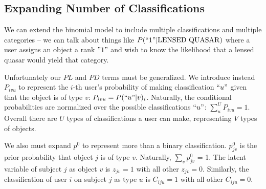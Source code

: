 \documentclass[useAMS,usenatbib,a4paper]{mn2e}
\begin{document}

\subsection{Expanding Number of Classifications}


We can extend the \SW binomial model to include multiple classifications and
multiple categories -- we can talk about things like $P(``1" | \rm{LENSED\
QUASAR})$ where a user assigns an object a rank $"1"$ and wish to know the
likelihood that a lensed quasar would yield that category.

Unfortunately our $PL$ and $PD$ terms must be
generalized. We introduce instead $P_{ivu}$ to represent the $i$-th user's
probability of making classification $``u"$ given that the object is of type
$v$: $P_{ivu} = P(``u" | v)_i$. Naturally, the conditional probabilities are
normalized over the possible classifications $``u"$: $\sum_u^U P_{ivu} = 1$. Overall there are $U$ types of
classifications a user can make, representing $V$ types of objects.

We also must expand $p^0$ to represent more than a binary classification.
$p_{jv}^0$ is the prior probability that object $j$ is of type $v$. Naturally,
$\sum_v p_{jv}^0$ = 1.
The latent variable of subject $j$ as object $v$ is $z_{jv} = 1$ with all
other $z_{jv} = 0$. Similarly, the classification of user $i$ on subject $j$
as type $u$ is $C_{iju} = 1$ with all other $C_{iju} = 0$.
\end{document}
